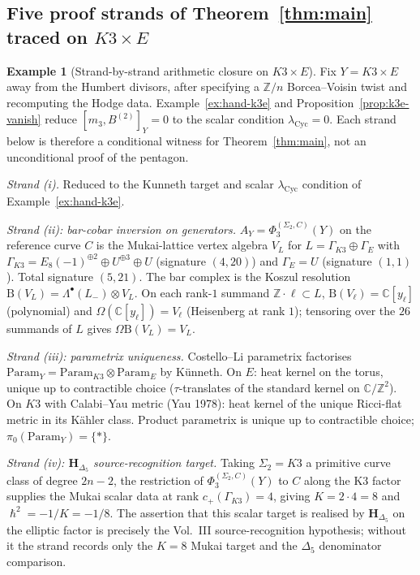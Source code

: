 \documentclass[11pt,reqno]{amsart}
\theoremstyle{plain}
\theoremstyle{definition}
\newtheorem{example}[theorem]{Example}
\theoremstyle{remark}
\newcommand{\Cbb}{\mathbb{C}}
\newcommand{\Zbb}{\mathbb{Z}}
\newcommand{\bfH}{\mathbf{H}}
\newcommand{\Bar}{\mathrm{B}}
\newcommand{\Cobar}{\Omega}
\newcommand{\hbar}{{\hslash}}
\begin{document}
\subsection{Five proof strands of Theorem~\ref{thm:main} traced on $K3 \times E$}
\label{sub:hand-strands}

\begin{example}[Strand-by-strand arithmetic closure on $K3 \times E$]
\label{ex:hand-strands}
Fix $Y = K3 \times E$ away from the Humbert divisors, after specifying a $\Zbb/n$ Borcea--Voisin twist and recomputing the Hodge data. Example~\ref{ex:hand-k3e} and Proposition~\ref{prop:k3e-vanish} reduce $[m_3, B^{(2)}]_Y = 0$ to the scalar condition $\lambda_{\mathrm{Cyc}}=0$. Each strand below is therefore a conditional witness for Theorem~\ref{thm:main}, not an unconditional proof of the pentagon.

\emph{Strand (i).} Reduced to the Kunneth target and scalar
$\lambda_{\mathrm{Cyc}}$ condition of Example~\ref{ex:hand-k3e}.

\emph{Strand (ii): bar-cobar inversion on generators.} $A_Y = \Phi_3^{(\Sigma_2,C)}(Y)$ on the reference curve $C$ is the Mukai-lattice vertex algebra $V_L$ for $L = \Gamma_{K3} \oplus \Gamma_E$ with $\Gamma_{K3} = E_8(-1)^{\oplus 2} \oplus U^{\oplus 3} \oplus U$ (signature $(4, 20)$) and $\Gamma_E = U$ (signature $(1, 1)$). Total signature $(5, 21)$. The bar complex is the Koszul resolution $\Bar(V_L) = \Lambda^\bullet(L_-) \otimes V_L$. On each rank-$1$ summand $\Zbb \cdot \ell \subset L$, $\Bar(V_\ell) = \Cbb[y_\ell]$ (polynomial) and $\Cobar(\Cbb[y_\ell]) = V_\ell$ (Heisenberg at rank $1$); tensoring over the $26$ summands of $L$ gives $\Cobar \Bar(V_L) = V_L$.

\emph{Strand (iii): parametrix uniqueness.} Costello--Li parametrix factorises $\mathrm{Param}_Y = \mathrm{Param}_{K3} \otimes \mathrm{Param}_E$ by K\"unneth. On $E$: heat kernel on the torus, unique up to contractible choice ($\tau$-translates of the standard kernel on $\Cbb/\Zbb^2$). On $K3$ with Calabi--Yau metric (Yau 1978): heat kernel of the unique Ricci-flat metric in its K\"ahler class. Product parametrix is unique up to contractible choice; $\pi_0(\mathrm{Param}_Y) = \{*\}$.

\emph{Strand (iv): $\bfH_{\Delta_5}$ source-recognition target.} Taking $\Sigma_2 = K3$ a primitive curve class of degree $2n - 2$, the restriction of $\Phi_3^{(\Sigma_2,C)}(Y)$ to $C$ along the K3 factor supplies the Mukai scalar data at rank $c_+(\Gamma_{K3}) = 4$, giving $K = 2 \cdot 4 = 8$ and $\hbar^2 = -1/K = -1/8$. The assertion that this scalar target is realised by $\bfH_{\Delta_5}$ on the elliptic factor is precisely the Vol.~III source-recognition hypothesis; without it the strand records only the $K=8$ Mukai target and the $\Delta_5$ denominator comparison.


\end{example}
\end{document}
